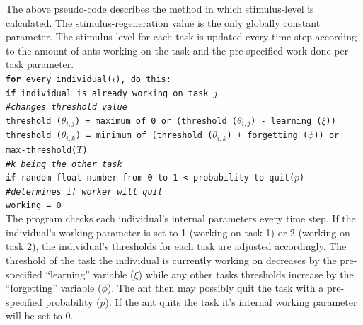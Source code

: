 \documentclass[a4paper]{article}
\begin{document}
The above pseudo-code describes the method in which stimulus-level is calculated. The stimulus-regeneration value is the only globally constant parameter. The stimulus-level for each task is updated every time step according to the amount of ants working on the task and the pre-specified work done per task parameter.\\

\noindent \texttt{\textbf{for} every individual($i$), do this:\\
\indent \textbf{if} individual is already working on task $j$\\
\indent \indent  \#\textit{changes threshold value}\\
\indent \indent threshold ($\theta_{i,j}$) = maximum of 0 or (threshold ($\theta_{i,j}$) - learning ($\xi$))\\
\indent \indent threshold ($\theta_{i,k}$) = minimum of (threshold ($\theta_{i,k}$) + forgetting ($\phi$)) or max-threshold($T$)\\
\indent \indent \textit{\#k being the other task}\\
\indent\indent  \textbf{if} random float number from 0 to 1 < probability to quit($p$)\\
\indent \indent \textit{\#determines if worker will quit}\\
\indent \indent \indent working = 0}\\

The program checks each individual’s internal parameters every time step. If the individual’s working parameter is set to 1 (working on task 1) or 2 (working on task 2), the individual’s thresholds for each task are adjusted accordingly. The threshold of the task the individual is currently working on decreases by the pre-specified “learning” variable ($\xi$) while any other tasks thresholds increase by the “forgetting” variable ($\phi$). The ant then may possibly quit the task with a pre-specified probability ($p$). If the ant quits the task it’s internal working parameter will be set to 0.\\
\end{document}
